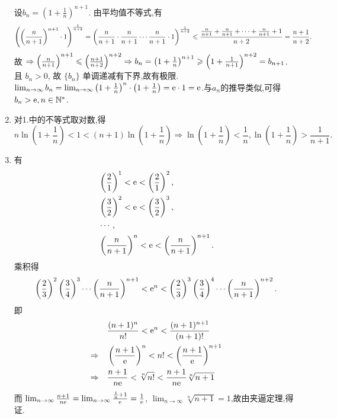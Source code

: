 \begin{example}
\begin{solution}
\begin{enumerate}
                  设$b_n = \left(1+\frac 1n \right)^{n+1}$.
                  由平均值不等式,有
                  $$\left( \left( \frac{n}{n+1} \right)^{n+1} \cdot 1 \right)^{\frac{1}{n+2}} =
                      \left( \frac{n}{n+1} \cdot \frac{n}{n+1} \cdots \frac{n}{n+1} \cdot 1 \right)^{\frac{1}{n+2}} \leqslant \frac{\frac{n}{n+1} + \frac{n}{n+1} + \cdots + \frac{n}{n+1}+1}{n+2} = \frac{n+1}{n+2}.$$
                  故 $\Rightarrow \left( \frac{n}{n+1} \right)^{n+1} \leqslant \left( \frac{n+1}{n+2} \right)^{n+2} \Rightarrow b_n = \left( 1 + \frac{1}{n} \right)^{n+1} \geqslant \left( 1 + \frac{1}{n+1} \right)^{n+2} = b_{n+1}$. 且 $b_n > 0 $, 故 $\{ b_n \}$ 单调递减有下界,故有极限. $\lim_{n \to \infty} b_n = \lim_{n \to \infty} \left( 1 + \frac{1}{n} \right)^{n} \cdot \left( 1 + \frac{1}{n} \right) = \mathrm{e} \cdot 1 = \mathrm{e}$.与$a_n$的推导类似,可得$b_n > \mathrm{e}, n \in \mathbb{N}^*$.
            \item 对1.中的不等式取对数,得
                  $$n \ln \left(1+\frac 1n \right) < 1 < (n+1) \ln \left(1+\frac 1n \right) \Rightarrow \ln \left(1+\frac 1n \right) < \frac 1n, \ln \left( 1+\frac 1n \right) > \frac 1{n+1}.$$
            \item
                  有\begin{align*}
                       & \left( \frac21 \right)^1 < \mathrm{e} < \left( \frac21 \right)^2,                 \\
                       & \left( \frac32 \right)^2 < \mathrm{e} < \left( \frac32 \right)^3,                 \\
                       & \cdots,                                                                   \\
                       & \left( \frac{n}{n+1} \right)^n < \mathrm{e} < \left( \frac{n}{n+1} \right)^{n+1}.
                  \end{align*}
                  乘积得
                  $$\left( \frac{2}{3} \right)^2 \left( \frac{3}{4} \right)^3 \cdots \left( \frac{n}{n+1} \right)^{n+1} < \mathrm{e}^n < \left( \frac{2}{3} \right)^3 \left( \frac{3}{4} \right)^4 \cdots \left( \frac{n}{n+1} \right)^{n+2}.$$即
                  \begin{align*}
                                        & \frac{(n+1)^n}{n!} < \mathrm{e}^n < \frac{(n+1)^{n+1}}{(n+1)!}                     \\
                      \Rightarrow \quad & \left( \frac{n+1}{\mathrm{e}} \right)^n < n! < \left( \frac{n+1}{\mathrm{e}} \right)^{n+1} \\
                      \Rightarrow \quad & \frac{n+1}{n\mathrm{e}} < \sqrt[n]{n!} < \frac{n+1}{n \mathrm{e}} \sqrt[n]{n+1}
                  \end{align*}
                  而 $\lim_{n \to \infty} \frac{n+1}{n\mathrm{e}} = \lim_{n \to \infty} \frac{\frac{1}{n}+1}{\mathrm{e}} = \frac{1}{\mathrm{e}}$, $\lim_{n \to \infty} \sqrt[n]{n+1} = 1$,故由夹逼定理,得证.
        \end{enumerate}
    \end{solution}
\end{example}

